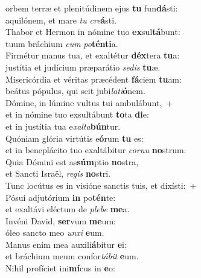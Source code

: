 \evenverse  orbem terræ et plenitúdinem ejus \textbf{tu} fun\textbf{dá}sti:~\*\\
\evenverse aquilónem, et mare \textit{tu} \textit{cre}\textbf{á}sti.\\
\oddverse Thabor et Hermon in nómine tuo \textbf{ex}sul\textbf{tá}bunt:~\*\\
\oddverse tuum bráchium \textit{cum} \textit{po}\textbf{tén}\textbf{ti}a.\\
\evenverse Firmétur manus tua, et exaltétur \textbf{déx}tera \textbf{tu}a:~\*\\
\evenverse justítia et judícium præparátio \textit{se}\textit{dis} \textbf{tu}æ.\\
\oddverse Misericórdia et véritas præcédent \textbf{fá}ciem \textbf{tu}am:~\*\\
\oddverse beátus pópulus, qui scit jubi\textit{la}\textit{ti}\textbf{ó}nem.\\
\evenverse Dómine, in lúmine vultus tui ambulábunt,~+\\
\evenverse  et in nómine tuo exsultábunt \textbf{to}ta \textbf{di}e:~\*\\
\evenverse et in justítia tua e\textit{xal}\textit{ta}\textbf{bún}tur.\\
\oddverse Quóniam glória virtútis e\textbf{ó}rum \textbf{tu} es:~\*\\
\oddverse et in beneplácito tuo exaltábitur \textit{cor}\textit{nu} \textbf{no}strum.\\
\evenverse Quia Dómini est as\textbf{súm}ptio \textbf{no}stra,~\*\\
\evenverse et Sancti Israël, \textit{re}\textit{gis} \textbf{no}stri.\\
\oddverse Tunc locútus es in visióne sanctis tuis, et dixísti:~+\\
\oddverse  Pósui adjutórium \textbf{in} po\textbf{tén}te:~\*\\
\oddverse et exaltávi eléctum de \textit{ple}\textit{be} \textbf{me}a.\\
\evenverse Invéni David, \textbf{ser}vum \textbf{me}um:~\*\\
\evenverse óleo sancto meo \textit{un}\textit{xi} \textbf{e}um.\\
\oddverse Manus enim mea auxili\textbf{á}bitur \textbf{e}i:~\*\\
\oddverse et bráchium meum confor\textit{tá}\textit{bit} \textbf{e}um.\\
\evenverse Nihil profíciet ini\textbf{mí}cus in \textbf{e}o:~\*\\
